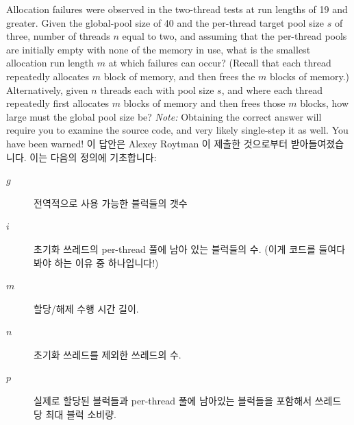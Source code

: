 \begin{enumerate}
	Allocation failures were observed in the two-thread
	tests at run lengths of 19 and greater.
	Given the global-pool size of 40 and the per-thread target
	pool size $s$ of three, number of threads $n$ equal to two,
	and assuming that the per-thread pools are initially
	empty with none of the memory in use, what is the smallest allocation
	run length $m$ at which failures can occur?
	(Recall that each thread repeatedly allocates $m$ block of memory,
	and then frees the $m$ blocks of memory.)
	Alternatively, given $n$ threads each with pool size $s$, and
	where each thread repeatedly first allocates $m$ blocks of memory
	and then frees those $m$ blocks, how large must the global pool
	size be?
	\emph{Note:} Obtaining the correct answer will require you to
	examine the  source code, and very likely
	single-step it as well.
	You have been warned!
	\fi
\QuickA{}
	이 답안은 Alexey Roytman 이 제출한 것으로부터 받아들여졌습니다.
	이는 다음의 정의에 기초합니다:
	\begin{description}
	\item[$g$]	전역적으로 사용 가능한 블럭들의 갯수
	\item[$i$]	초기화 쓰레드의 per-thread 풀에 남아 있는 블럭들의 수.
			(이게 코드를 들여다봐야 하는 이유 중 하나입니다!)
	\item[$m$]	할당/해제 수행 시간 길이.
	\item[$n$]	초기화 쓰레드를 제외한 쓰레드의 수.
	\item[$p$]	실제로 할당된 블럭들과 per-thread 풀에 남아있는
			블럭들을 포함해서 쓰레드 당 최대 블럭 소비량.
	\end{description}

\end{enumerate}
